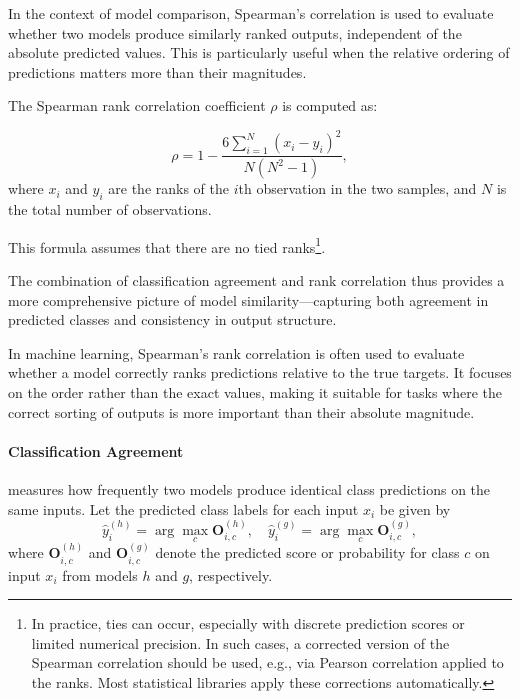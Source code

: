 In the context of model comparison, Spearman's correlation is used to evaluate whether two models produce similarly ranked outputs, independent of the absolute predicted values.
This is particularly useful when the relative ordering of predictions matters more than their magnitudes.

The Spearman rank correlation coefficient \( \rho \) is computed as:

\[
\rho = 1 - \frac{6 \sum_{i=1}^N (x_i - y_i)^2}{N(N^2 - 1)},
\]
where \( x_i \) and \( y_i \) are the ranks of the \( i \)th observation in the two samples, and \( N \) is the total number of observations.

This formula assumes that there are no tied ranks\footnote{In practice, ties can occur, especially with discrete prediction scores or limited numerical precision.
In such cases, a corrected version of the Spearman correlation should be used, e.g., via Pearson correlation applied to the ranks. Most statistical libraries apply these corrections automatically.}.

The combination of classification agreement and rank correlation thus provides a more comprehensive picture of model similarity—capturing both agreement in predicted classes and consistency in output structure.

In machine learning, Spearman's rank correlation is often used to evaluate whether a model correctly ranks predictions relative to the true targets. It focuses on the order rather than the exact values, making it suitable for tasks where the correct sorting of outputs is more important than their absolute magnitude.



\paragraph{Classification Agreement} 
measures how frequently two models produce identical class predictions on the same inputs.
Let the predicted class labels for each input \( x_i \) be given by
\[
\hat{y}^{(h)}_i = \arg\max_c \mathbf{O}^{(h)}_{i,c}, \quad
\hat{y}^{(g)}_i = \arg\max_c \mathbf{O}^{(g)}_{i,c},
\]
where \( \mathbf{O}^{(h)}_{i,c} \) and \( \mathbf{O}^{(g)}_{i,c} \) denote the predicted score or probability for class \( c \) on input \( x_i \) from models \( h \) and \( g \), respectively.

